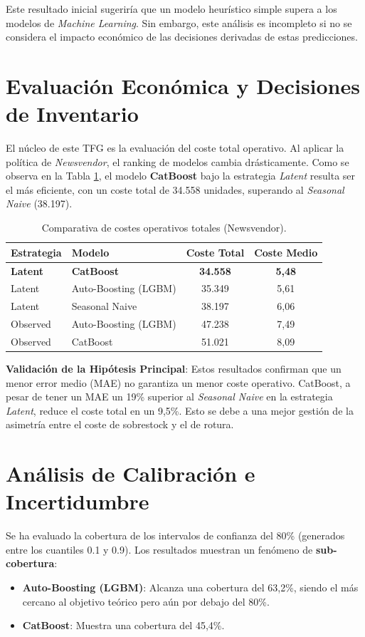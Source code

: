 Este resultado inicial sugeriría que un modelo heurístico simple supera a los modelos de \textit{Machine Learning}. Sin embargo, este análisis es incompleto si no se considera el impacto económico de las decisiones derivadas de estas predicciones.

\section{Evaluación Económica y Decisiones de Inventario}
El núcleo de este TFG es la evaluación del coste total operativo. Al aplicar la política de \textit{Newsvendor}, el ranking de modelos cambia drásticamente. Como se observa en la Tabla \ref{tab:metrics_cost}, el modelo \textbf{CatBoost} bajo la estrategia \textit{Latent} resulta ser el más eficiente, con un coste total de 34.558 unidades, superando al \textit{Seasonal Naive} (38.197).

\begin{table}[h]
\centering
\begin{tabular}{@{}llcc@{}}
\toprule
\textbf{Estrategia} & \textbf{Modelo} & \textbf{Coste Total} & \textbf{Coste Medio} \\ \midrule
\textbf{Latent} & \textbf{CatBoost} & \textbf{34.558} & \textbf{5,48} \\
Latent & Auto-Boosting (LGBM) & 35.349 & 5,61 \\
Latent & Seasonal Naive & 38.197 & 6,06 \\ \midrule
Observed & Auto-Boosting (LGBM) & 47.238 & 7,49 \\
Observed & CatBoost & 51.021 & 8,09 \\
\bottomrule
\end{tabular}
\caption{Comparativa de costes operativos totales (Newsvendor).}
\label{tab:metrics_cost}
\end{table}

\textbf{Validación de la Hipótesis Principal}: Estos resultados confirman que un menor error medio (MAE) no garantiza un menor coste operativo. CatBoost, a pesar de tener un MAE un 19\% superior al \textit{Seasonal Naive} en la estrategia \textit{Latent}, reduce el coste total en un 9,5\%. Esto se debe a una mejor gestión de la asimetría entre el coste de sobrestock y el de rotura.

\section{Análisis de Calibración e Incertidumbre}
Se ha evaluado la cobertura de los intervalos de confianza del 80\% (generados entre los cuantiles 0.1 y 0.9). Los resultados muestran un fenómeno de \textbf{sub-cobertura}:
\begin{itemize}
    \item \textbf{Auto-Boosting (LGBM)}: Alcanza una cobertura del 63,2\%, siendo el más cercano al objetivo teórico pero aún por debajo del 80\%.
    \item \textbf{CatBoost}: Muestra una cobertura del 45,4\%.
\end{itemize}

